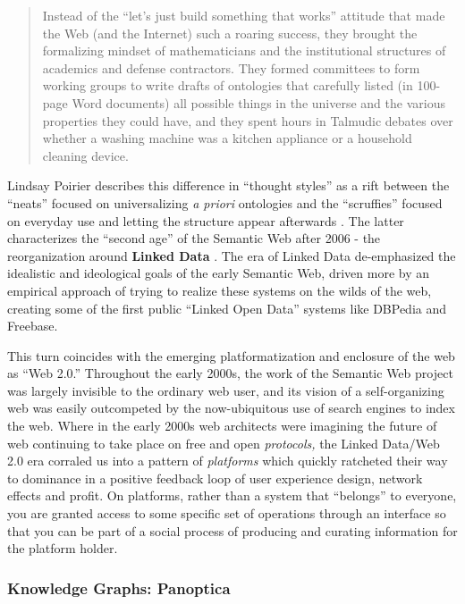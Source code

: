 \begin{quote}
Instead of the ``let's just build something that works'' attitude that
made the Web (and the Internet) such a roaring success, they brought the
formalizing mindset of mathematicians and the institutional structures
of academics and defense contractors. They formed committees to form
working groups to write drafts of ontologies that carefully listed (in
100-page Word documents) all possible things in the universe and the
various properties they could have, and they spent hours in Talmudic
debates over whether a washing machine was a kitchen appliance or a
household cleaning device. \cite{swartzAaronSwartzProgrammable2013} 
\end{quote}

Lindsay Poirier describes this difference in ``thought styles'' as a
rift between the ``neats'' focused on universalizing \emph{a priori}
ontologies and the ``scruffies'' focused on everyday use and letting the
structure appear afterwards \cite{poirierTurnScruffyEthnographic2017} . The latter characterizes the ``second age'' of the Semantic Web
after 2006 - the reorganization around \textbf{Linked Data} \cite{berners-leeLinkedData2006, hitzlerReviewSemanticWeb2021} . The era of
Linked Data de-emphasized the idealistic and ideological goals of the
early Semantic Web, driven more by an empirical approach of trying to
realize these systems on the wilds of the web, creating some of the
first public ``Linked Open Data'' systems like DBPedia and Freebase.

This turn coincides with the emerging platformatization and enclosure of
the web as ``Web 2.0.'' Throughout the early 2000s, the work of the
Semantic Web project was largely invisible to the ordinary web user, and
its vision of a self-organizing web was easily outcompeted by the
now-ubiquitous use of search engines to index the web. Where in the
early 2000s web architects were imagining the future of web continuing
to take place on free and open \emph{protocols,} the Linked Data/Web 2.0
era corraled us into a pattern of \emph{platforms} which quickly
ratcheted their way to dominance in a positive feedback loop of user
experience design, network effects and profit. On platforms, rather than
a system that ``belongs'' to everyone, you are granted access to some
specific set of operations through an interface so that you can be part
of a social process of producing and curating information for the
platform holder.

\hypertarget{knowledge-graphs-panoptica}{%
\subsubsection{Knowledge Graphs:
Panoptica}\label{knowledge-graphs-panoptica}}


